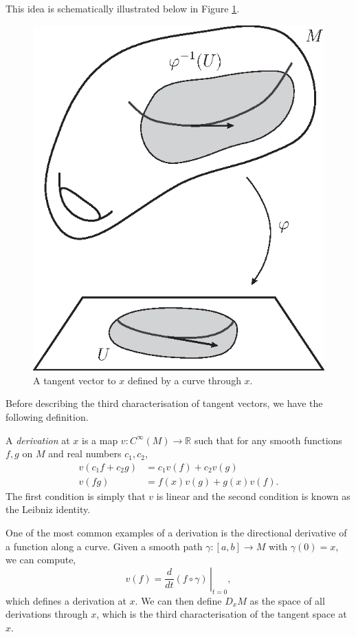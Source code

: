 This idea is schematically illustrated below in Figure \ref{fig:tang-1}. 

\begin{figure}[h!]
\centering
\includegraphics[scale=0.75]{fig/tang-3b}
\caption{A tangent vector to $x$ defined by a curve through $x$.}
\label{fig:tang-1}
\end{figure}

Before describing the third characterisation of tangent vectors, we have the following definition.
\begin{definition}
\label{def:derivation}
A \textit{derivation} at $x$ is a map $v:C^{\infty}(M)\to\mathbb{R}$ such that for any smooth functions $f,g$ on $M$ and real numbers $c_1,c_2$,
\begin{align*}
v(c_1f+c_2g)&=c_1v(f)+c_2v(g)\\
v(fg)&=f(x)v(g)+g(x)v(f).
\end{align*}
The first condition is simply that $v$ is linear and the second condition is known as the Leibniz identity.
\end{definition}
One of the most common examples of a derivation is the directional derivative of a function along a curve. Given a smooth path $\gamma:[a,b]\to M$ with $\gamma(0)=x$, we can compute,
\begin{equation}
v(f)=\left.\frac{d}{dt}(f\circ\gamma)\,\right\rvert_{t=0},
\label{eq:derivation-dirderiv}
\end{equation}
which defines a derivation at $x$. We can then define $D_xM$ as the space of all derivations through $x$, which is the third characterisation of the tangent space at $x$.

